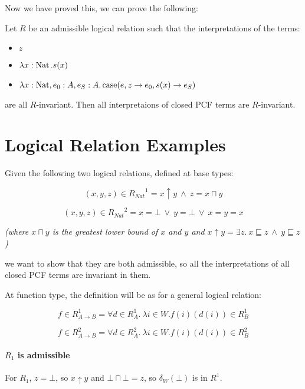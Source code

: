
Now we have proved this, we can prove the following:

\vspace{0.5cm}

\begin{thm}{\citep{Streicher06}}
Let $R$ be an admissible logical relation such that the interpretations of the terms:

\begin{itemize}
\item{$z$}
\item{$\lambda x: \operatorname{Nat}. s(x)$}
\item{$\lambda x: \operatorname{Nat}, e_0 : A, e_S: A. \operatorname{case}(e,z \to e_0,s(x) \to e_S)$}
\end{itemize}

are all $R$-invariant. Then all interpretaions of closed PCF terms are $R$-invariant.
\end{thm}

\section{Logical Relation Examples}
Given the following two logical relations, defined at base types:

\[ (x,y,z) \in {R_{Nat}}^1 = x \uparrow y \ \wedge \ z = x \sqcap y\]

\[ (x,y,z) \in {R_{Nat}}^2 = x = \bot \ \vee \ y = \bot \ \vee \ x=y=x \]

\emph{(where $x \sqcap y$ is the greatest lower bound of $x$ and $y$ and $x \uparrow y = \exists z. \ x \sqsubseteq z \ \wedge \ y \sqsubseteq z$)}

we want to show that they are both admissible, so all the interpretations of all closed PCF terms are invariant in them. 

At function type, the definition will be as for a general logical relation:

\[ f \in R_{A \to B}^1 = \forall d \in R_A^1. \ \lambda i \in W. f(i)(d(i)) \in R_B^1 \]

\[ f \in R_{A \to B}^2 = \forall d \in R_A^2. \ \lambda i \in W. f(i)(d(i)) \in R_B^2 \]

\paragraph{$R_1$ is admissible} For $R_1$, $z = \bot$, so $x \uparrow y$ and $\bot \sqcap \bot = z$, so $\delta_W(\bot)$ is in $R^1$.

